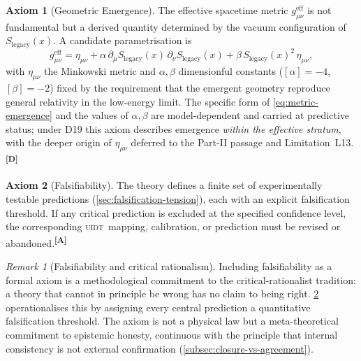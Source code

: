 \documentclass[12pt,a4paper,twoside]{article}
\theoremstyle{plain}
\theoremstyle{definition}
\newtheorem{axiom}{Axiom}
\theoremstyle{remark}
\newtheorem{remark}[theorem]{Remark}
\newcommand{\UIDT}{\textsc{uidt}}
\newcommand{\catmark}[1]{\textsuperscript{\textsf{\textbf{[#1]}}}}
\newcommand{\LegacySx}{S_{\mathrm{legacy}}(x)} %
\begin{document}
\begin{axiom}[Geometric Emergence]
\label{ax:emergence}
The effective spacetime metric $g_{\mu\nu}^{\mathrm{eff}}$ is not
fundamental but a derived quantity determined by the vacuum
configuration of $\LegacySx$. A candidate parametrisation is
\begin{equation}
 g_{\mu\nu}^{\mathrm{eff}} = \eta_{\mu\nu}
 + \alpha\,\partial_\mu\LegacySx\,\partial_\nu\LegacySx
 + \beta\,\LegacySx^2\,\eta_{\mu\nu},
 \label{eq:metric-emergence}
\end{equation}
with $\eta_{\mu\nu}$ the Minkowski metric and $\alpha,\beta$
dimensionful constants ($[\alpha]=-4$, $[\beta]=-2$) fixed by the
requirement that the emergent geometry reproduce general relativity in
the low-energy limit. The specific form of \cref{eq:metric-emergence}
and the values of $\alpha,\beta$ are model-dependent and carried at
predictive status; under D19 this axiom describes emergence \emph{within
the effective stratum}, with the deeper origin of $\eta_{\mu\nu}$
deferred to the Part-II passage and Limitation~L13.\catmark{D}
\end{axiom}

\begin{axiom}[Falsifiability]
\label{ax:falsifiability}
The theory defines a finite set of experimentally testable predictions
(\cref{sec:falsification-tension}), each with an explicit falsification
threshold. If any critical prediction is excluded at the specified
confidence level, the corresponding \UIDT\ mapping, calibration, or
prediction must be revised or abandoned.\catmark{A}
\end{axiom}

\begin{remark}[Falsifiability and critical rationalism]
\label{rem:popper}
Including falsifiability as a formal axiom is a methodological
commitment to the critical-rationalist tradition: a theory that cannot
in principle be wrong has no claim to being right.
\cref{ax:falsifiability} operationalises this by assigning every central
prediction a quantitative falsification threshold. The axiom is not a
physical law but a meta-theoretical commitment to epistemic honesty,
continuous with the principle that internal consistency is not external
confirmation (\cref{subsec:closure-vs-agreement}).
\end{remark}
\end{document}
